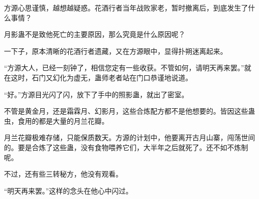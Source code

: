\begin{this_body}
方源心思谨慎，越想越疑惑。花酒行者当年战败家老，暂时撤离后，到底发生了什么事情？

月影蛊不是致他死亡的主要原因，那么究竟是什么原因呢？

一下子，原本清晰的花酒行者遗藏，又在方源眼中，显得扑朔迷离起来。

“方源大人，已经一刻钟了，相信您定有一些收获。不管如何，请明天再来罢。”就在这时，石门又幻化为虚无，蛊师老者站在门口恭谨地说道。

“好。”方源目光闪了闪，放下了手中的照影蛊，就出了密室。

不管是黄金月，还是霜霖月、幻影月，这些合炼配方都不是他想要的。皆因这些蛊虫，食用的都是大量的月兰花瓣。

月兰花瓣极难存储，只能保质数天。方源的计划中，他要离开古月山寨，闯荡世间的。要是合炼了这些蛊，没有食物喂养它们，大半年之后就死了。还不如不炼制呢。

不过，还有些三转秘方，他没有观看。

“明天再来罢。”这样的念头在他心中闪过。

\end{this_body}

